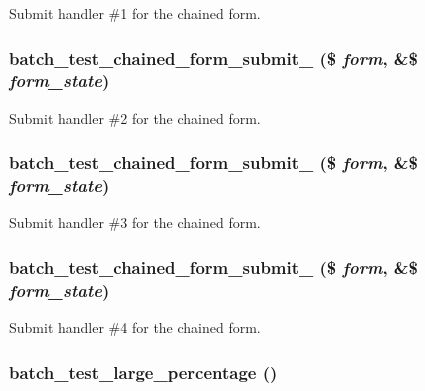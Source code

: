 \label{batch__test_8module_a2f5996696bbb4db0285667a7e9d12f41}
Submit handler \#1 for the chained form. \hypertarget{batch__test_8module_a7d6ba1cbb121fc9a6f908897aac34bdc}{
\subsubsection[{batch\_\-test\_\-chained\_\-form\_\-submit\_\-2}]{\setlength{\rightskip}{0pt plus 5cm}batch\_\-test\_\-chained\_\-form\_\-submit\_ (\$ {\em form}, \/  \&\$ {\em form\_\-state})}}
\label{batch__test_8module_a7d6ba1cbb121fc9a6f908897aac34bdc}
Submit handler \#2 for the chained form. \hypertarget{batch__test_8module_a1b6b2d190b2fe94b61a63f448dbef2d7}{
\subsubsection[{batch\_\-test\_\-chained\_\-form\_\-submit\_\-3}]{\setlength{\rightskip}{0pt plus 5cm}batch\_\-test\_\-chained\_\-form\_\-submit\_ (\$ {\em form}, \/  \&\$ {\em form\_\-state})}}
\label{batch__test_8module_a1b6b2d190b2fe94b61a63f448dbef2d7}
Submit handler \#3 for the chained form. \hypertarget{batch__test_8module_a9060ee2b4e66f050cb62864a8445fa8b}{
\subsubsection[{batch\_\-test\_\-chained\_\-form\_\-submit\_\-4}]{\setlength{\rightskip}{0pt plus 5cm}batch\_\-test\_\-chained\_\-form\_\-submit\_ (\$ {\em form}, \/  \&\$ {\em form\_\-state})}}
\label{batch__test_8module_a9060ee2b4e66f050cb62864a8445fa8b}
Submit handler \#4 for the chained form. \hypertarget{batch__test_8module_a61e2159da3c242f090bdddb92a0a9977}{
\subsubsection[{batch\_\-test\_\-large\_\-percentage}]{\setlength{\rightskip}{0pt plus 5cm}batch\_\-test\_\-large\_\-percentage ()}}

